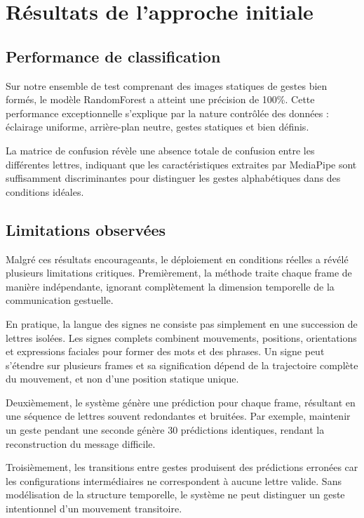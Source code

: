 \documentclass[twocolumn]{el-author}
\begin{document}
\section{Résultats de l'approche initiale}

\subsection{Performance de classification}

Sur notre ensemble de test comprenant des images statiques de gestes bien formés, le modèle RandomForest a atteint une précision de 100\%. Cette performance exceptionnelle s'explique par la nature contrôlée des données : éclairage uniforme, arrière-plan neutre, gestes statiques et bien définis.

La matrice de confusion révèle une absence totale de confusion entre les différentes lettres, indiquant que les caractéristiques extraites par MediaPipe sont suffisamment discriminantes pour distinguer les gestes alphabétiques dans des conditions idéales.

\subsection{Limitations observées}

Malgré ces résultats encourageants, le déploiement en conditions réelles a révélé plusieurs limitations critiques. Premièrement, la méthode traite chaque frame de manière indépendante, ignorant complètement la dimension temporelle de la communication gestuelle.

En pratique, la langue des signes ne consiste pas simplement en une succession de lettres isolées. Les signes complets combinent mouvements, positions, orientations et expressions faciales pour former des mots et des phrases. Un signe peut s'étendre sur plusieurs frames et sa signification dépend de la trajectoire complète du mouvement, et non d'une position statique unique.

Deuxièmement, le système génère une prédiction pour chaque frame, résultant en une séquence de lettres souvent redondantes et bruitées. Par exemple, maintenir un geste pendant une seconde génère 30 prédictions identiques, rendant la reconstruction du message difficile.

Troisièmement, les transitions entre gestes produisent des prédictions erronées car les configurations intermédiaires ne correspondent à aucune lettre valide. Sans modélisation de la structure temporelle, le système ne peut distinguer un geste intentionnel d'un mouvement transitoire.
\end{document}
